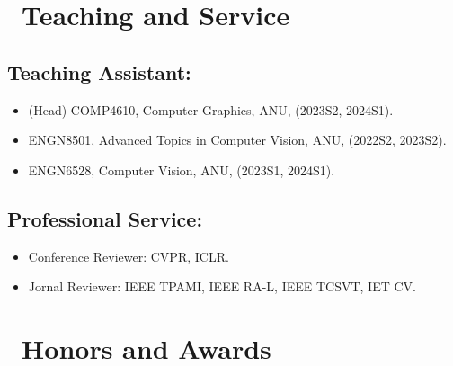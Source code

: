 \documentclass{resume}
\begin{document}



\section{\faInfo\ Teaching and Service}
\subsection*{Teaching Assistant:}
\begin{itemize}[parsep=0.5ex]
  \item (Head) COMP4610, Computer Graphics, ANU, (2023S2, 2024S1).
  \item ENGN8501, Advanced Topics in Computer Vision, ANU, (2022S2, 2023S2).
  \item ENGN6528, Computer Vision, ANU, (2023S1, 2024S1).
\end{itemize}
\subsection{Professional Service:}
\begin{itemize}[parsep=0.5ex]
    \item Conference Reviewer: CVPR, ICLR.
    \item Jornal Reviewer: IEEE TPAMI, IEEE RA-L, IEEE TCSVT, IET CV.
\end{itemize}

\section{\faHourglass\ Honors and Awards}

%
%
\end{document}
